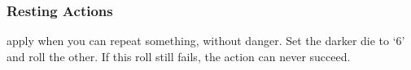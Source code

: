 \subsubsection{Resting Actions}
apply when you can repeat something, without danger.
Set the darker die to `6' and roll the other.
If this roll still fails, the action can never succeed.
